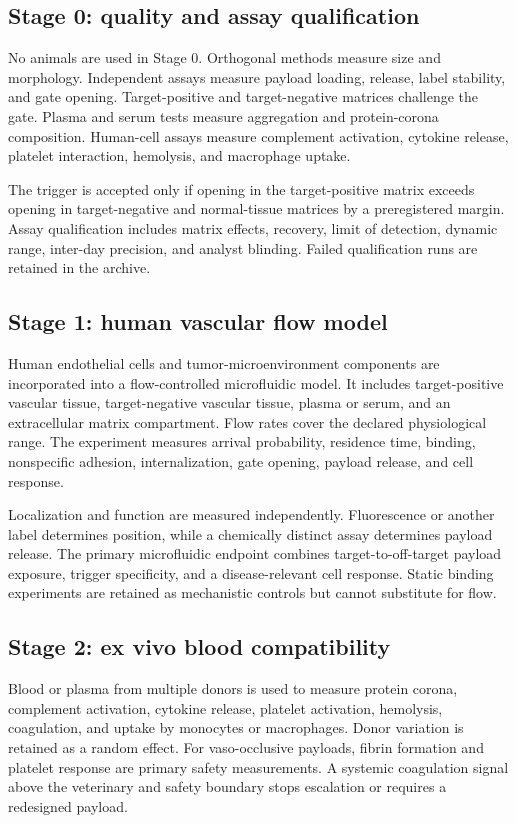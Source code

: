 \documentclass[conference]{IEEEtran}
\begin{document}
\subsection{Stage 0: quality and assay qualification}
No animals are used in Stage 0. Orthogonal methods measure size and morphology. Independent assays measure payload loading, release, label stability, and gate opening. Target-positive and target-negative matrices challenge the gate. Plasma and serum tests measure aggregation and protein-corona composition. Human-cell assays measure complement activation, cytokine release, platelet interaction, hemolysis, and macrophage uptake.

The trigger is accepted only if opening in the target-positive matrix exceeds opening in target-negative and normal-tissue matrices by a preregistered margin. Assay qualification includes matrix effects, recovery, limit of detection, dynamic range, inter-day precision, and analyst blinding. Failed qualification runs are retained in the archive.

\subsection{Stage 1: human vascular flow model}
Human endothelial cells and tumor-microenvironment components are incorporated into a flow-controlled microfluidic model. It includes target-positive vascular tissue, target-negative vascular tissue, plasma or serum, and an extracellular matrix compartment. Flow rates cover the declared physiological range. The experiment measures arrival probability, residence time, binding, nonspecific adhesion, internalization, gate opening, payload release, and cell response.

Localization and function are measured independently. Fluorescence or another label determines position, while a chemically distinct assay determines payload release. The primary microfluidic endpoint combines target-to-off-target payload exposure, trigger specificity, and a disease-relevant cell response. Static binding experiments are retained as mechanistic controls but cannot substitute for flow.

\subsection{Stage 2: ex vivo blood compatibility}
Blood or plasma from multiple donors is used to measure protein corona, complement activation, cytokine release, platelet activation, hemolysis, coagulation, and uptake by monocytes or macrophages. Donor variation is retained as a random effect. For vaso-occlusive payloads, fibrin formation and platelet response are primary safety measurements. A systemic coagulation signal above the veterinary and safety boundary stops escalation or requires a redesigned payload.
\end{document}
